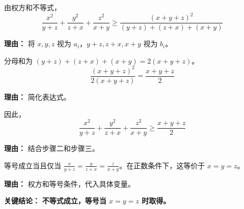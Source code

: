 \begin{examplebox}
\begin{description}[style=nextline, leftmargin=2.8em, labelsep=0.5em, itemsep=0.45em]
    \item[\textbf{第二步（应用权方和）：}] 由权方和不等式，
    \[
        \frac{x^2}{y+z} + \frac{y^2}{z+x} + \frac{z^2}{x+y} \geq \frac{(x+y+z)^2}{(y+z)+(z+x)+(x+y)}
    \]
    \par\textbf{理由：}
    将 $x,y,z$ 视为 $a_i$，$y+z, z+x, x+y$ 视为 $b_i$。

    \item[\textbf{第三步（计算分母和）：}] 分母和为 $(y+z)+(z+x)+(x+y) = 2(x+y+z)$。
    \[
        \frac{(x+y+z)^2}{2(x+y+z)} = \frac{x+y+z}{2}
    \]
    \par\textbf{理由：}
    简化表达式。

    \item[\textbf{第四步（得到不等式）：}] 因此，
    \[
        \frac{x^2}{y+z} + \frac{y^2}{z+x} + \frac{z^2}{x+y} \geq \frac{x+y+z}{2}
    \]
    \par\textbf{理由：}
    结合步骤二和步骤三。

    \item[\textbf{第五步（取等条件）：}] 等号成立当且仅当 $\frac{x}{y+z} = \frac{y}{z+x} = \frac{z}{x+y}$。在正数条件下，这等价于 $x=y=z$。
    \par\textbf{理由：}
    权方和等号条件，代入具体变量。
\end{description}

\textbf{\textcolor{CExample}{关键结论：}} \textbf{不等式成立，等号当 $x=y=z$ 时取得。}
\end{examplebox}
